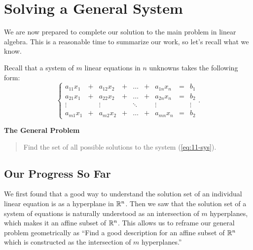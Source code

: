 \documentclass[elementsmain.tex]{subfiles}
\begin{document}
\section{Solving a General System}

We are now prepared to complete our solution to the main problem in linear algebra. This is a reasonable time to summarize our work, so let's recall what we know.

Recall that a system of $m$ linear equations in $n$ unknowns takes the following form:
\begin{equation}\label{eq:11-sys}
\left\{
\begin{array}{ccccccccc}
a_{11} x_1 & + & a_{12} x_2 & + & \dots & + & a_{1n} x_n & = & b_1 \\
a_{21} x_1 & + & a_{22} x_2 & + & \dots & + & a_{2n} x_n & = & b_2 \\
\vdots     &   & \vdots     &   & \ddots &  & \vdots     &  & \vdots \\ 
a_{m1} x_1 & + & a_{m2} x_2 & + & \dots & + & a_{mn} x_n & = & b_2 
\end{array}\right..
\end{equation}

\textbf{The General Problem}
\begin{quotation}
Find the set of all possible solutions to the system (\ref{eq:11-sys}).
\end{quotation}

\subsection*{Our Progress So Far}

We first found that a good way to understand the solution set of an individual linear equation is as a hyperplane in $\mathbb{R}^n$. 
Then we saw that the solution set of a system of equations is naturally understood as an intersection of $m$ hyperplanes, which makes it an affine subset of $\mathbb{R}^n$.
This allows us to reframe our general problem geometrically as ``Find a good description for an affine subset of $\mathbb{R}^n$ which is constructed as the intersection of $m$ hyperplanes.''
\end{document}
